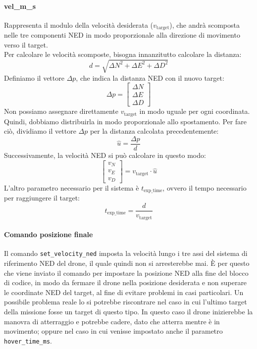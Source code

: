 \paragraph{vel\_m\_s} Rappresenta il modulo della velocità desiderata ($v_\mathrm{target}$), che andrà scomposta nelle tre componenti NED in modo proporzionale alla direzione di movimento verso il target. \\
Per calcolare le velocità scomposte, bisogna innanzitutto calcolare la distanza:
\[
d =
\sqrt{
	\Delta N^2 +
	\Delta E^2 +
	\Delta D^2
}
\]
Definiamo il vettore $\Delta p$, che indica la distanza NED con il nuovo target:
\[
\Delta p =
\begin{bmatrix}
	\Delta N \\
	\Delta E \\
	\Delta D
\end{bmatrix}
\]
Non possiamo assegnare direttamente $v_\mathrm{target}$ in modo uguale per ogni coordinata. Quindi, dobbiamo distribuirla in modo proporzionale allo spostamento. Per fare ciò, dividiamo il vettore $\Delta p$ per la distanza calcolata precedentemente:
\[
\hat{u} =
\frac{\Delta p}{d}
\]
Successivamente, la velocità NED si può calcolare in questo modo:
\[
\begin{bmatrix}
	v_N \\
	v_E \\
	v_D
\end{bmatrix}
=
v_\mathrm{target}\cdot \hat{u}
\]
L'altro parametro necessario per il sistema è $t_\mathrm{exp\_time}$, ovvero il tempo necessario per raggiungere il target:
\[
t_\mathrm{exp\_time} = \frac{d}{v_\mathrm{target}}
\]

\paragraph{Comando posizione finale} Il comando \texttt{set\_velocity\_ned} imposta la velocità lungo i tre assi del sistema di riferimento NED del drone, il quale quindi non si arresterebbe mai. È per questo che viene inviato il comando per impostare la posizione NED alla fine del blocco di codice, in modo da fermare il drone nella posizione desiderata e non superare le coordinate NED del target, al fine di evitare problemi in casi particolari. Un possibile problema reale lo si potrebbe riscontrare nel caso in cui l'ultimo target della missione fosse un target di questo tipo. In questo caso il drone inizierebbe la manovra di atterraggio e potrebbe cadere, dato che atterra mentre è in movimento; oppure nel caso in cui venisse impostato anche il parametro \texttt{hover\_time\_ms}.

